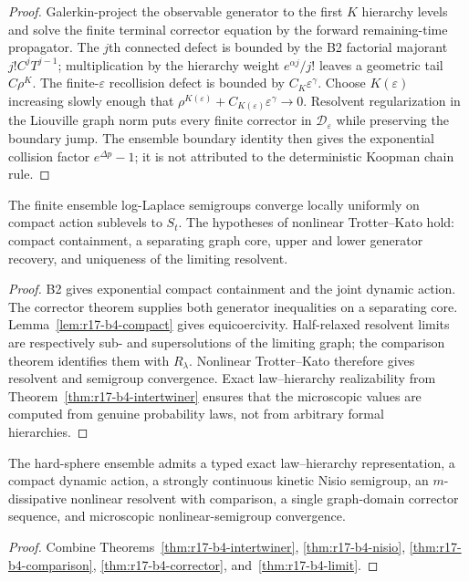 \begin{proof}
Galerkin-project the observable generator to the first $K$ hierarchy levels
and solve the finite terminal corrector equation by the forward
remaining-time propagator.  The $j$th connected defect is bounded by the B2
factorial majorant $j!C^jT^{j-1}$; multiplication by the hierarchy weight
$e^{\alpha j}/j!$ leaves a geometric tail $C\rho^K$.  The finite-$\varepsilon$
recollision defect is bounded by $C_K\varepsilon^\gamma$.  Choose
$K(\varepsilon)$ increasing slowly enough that
$\rho^{K(\varepsilon)}+C_{K(\varepsilon)}\varepsilon^\gamma\to0$.
Resolvent regularization in the Liouville graph norm puts every finite
corrector in $\mathscr D_\varepsilon$ while preserving the boundary jump.
The ensemble boundary identity then gives the exponential collision factor
$e^{\Delta p}-1$; it is not attributed to the deterministic Koopman chain
rule.
\end{proof}

\begin{theorem}
\label{thm:r17-b4-limit}
The finite ensemble log-Laplace semigroups converge locally uniformly on
compact action sublevels to $S_t$.  The hypotheses of nonlinear
Trotter--Kato hold: compact containment, a separating graph core, upper and
lower generator recovery, and uniqueness of the limiting resolvent.
\end{theorem}

\begin{proof}
B2 gives exponential compact containment and the joint dynamic action.  The
corrector theorem supplies both generator inequalities on a separating core.
Lemma~\ref{lem:r17-b4-compact} gives equicoercivity.  Half-relaxed resolvent
limits are respectively sub- and supersolutions of the limiting graph; the
comparison theorem identifies them with $R_\lambda$.  Nonlinear
Trotter--Kato therefore gives resolvent and semigroup convergence.  Exact
law--hierarchy realizability from Theorem~\ref{thm:r17-b4-intertwiner} ensures
that the microscopic values are computed from genuine probability laws, not
from arbitrary formal hierarchies.
\end{proof}

\begin{theorem}
\label{thm:r17-b4-main}
The hard-sphere ensemble admits a typed exact law--hierarchy representation,
a compact dynamic action, a strongly continuous kinetic Nisio semigroup, an
$m$-dissipative nonlinear resolvent with comparison, a single graph-domain
corrector sequence, and microscopic nonlinear-semigroup convergence.
\end{theorem}

\begin{proof}
Combine Theorems~\ref{thm:r17-b4-intertwiner},
\ref{thm:r17-b4-nisio}, \ref{thm:r17-b4-comparison},
\ref{thm:r17-b4-corrector}, and~\ref{thm:r17-b4-limit}.
\end{proof}
